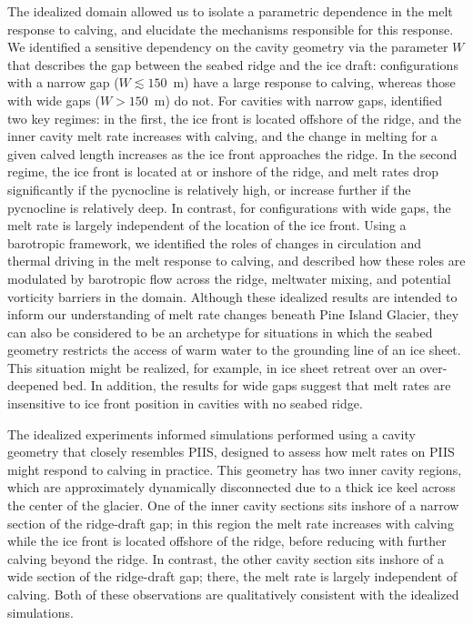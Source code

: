 \documentclass[draft]{agujournal2019}
\begin{document}
The idealized domain allowed us to isolate a parametric dependence in the melt response to calving, and elucidate the mechanisms responsible for this response. We identified a sensitive dependency on the cavity geometry via the parameter $W$ that describes the gap between the seabed ridge and the ice draft: configurations with a narrow gap ($W \lesssim 150$~m) have a large response to calving, whereas those with wide gaps ($W>150$~m) do not. For cavities with narrow gaps, identified two key regimes: in the first, the ice front is located offshore of the ridge, and the inner cavity melt rate increases with calving, and the change in melting for a given calved length increases as the ice front approaches the ridge. In the second regime, the ice front is located at or inshore of the ridge, and melt rates drop significantly if the pycnocline is relatively high, or increase further if the pycnocline is relatively deep. In contrast, for configurations with wide gaps, the melt rate is largely independent of the location of the ice front. Using a barotropic framework, we identified the roles of changes in circulation and thermal driving in the melt response to calving, and  described how these roles are modulated by barotropic flow across the ridge, meltwater mixing, and potential vorticity barriers in the domain. Although these idealized results are intended to inform our understanding of melt rate changes beneath Pine Island Glacier, they can also be considered to be an archetype for situations in which the seabed geometry restricts the access of warm water to the grounding line of an ice sheet. This situation might be realized, for example, in ice sheet retreat over an over-deepened bed. In addition, the results for wide gaps suggest that melt rates are insensitive to ice front position in cavities with no seabed ridge.

The idealized experiments informed simulations performed using a cavity geometry that closely resembles PIIS, designed to assess how melt rates on PIIS might respond to calving in practice. This geometry has two inner cavity regions, which are approximately dynamically disconnected due to a thick ice keel across the center of the glacier. One of the inner cavity sections sits inshore of a narrow section of the ridge-draft gap; in this region the melt rate increases with calving while the ice front is located offshore of the ridge, before reducing with further calving beyond the ridge. In contrast, the other cavity section sits inshore of a wide section of the ridge-draft gap; there, the melt rate is largely independent of calving. Both of these observations are qualitatively consistent with the idealized simulations. %
\end{document}
